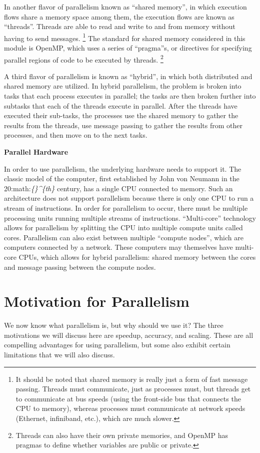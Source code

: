\documentclass[letterpaper,10pt,openany,oneside]{sphinxmanual}
\begin{document}
In another flavor of parallelism known as “shared memory”, in which
execution flows share a memory space among them, the execution flows are
known as “threads”. Threads are able to read and write to and from
memory without having to send messages. \footnote{
It should be noted that shared memory is really just a form of fast message passing. Threads must communicate, just as processes must, but threads get to communicate at bus speeds (using the front-side bus that connects the CPU to memory), whereas processes must communicate at network speeds (Ethernet, infiniband, etc.), which are much slower.
} The standard for shared
memory considered in this module is OpenMP, which uses a series of
“pragma”s, or directives for specifying parallel regions of code to be
executed by threads. \footnote{
Threads can also have their own private memories, and OpenMP has pragmas to define whether variables are public or private.
}

A third flavor of parallelism is known as “hybrid”, in which both
distributed and shared memory are utilized. In hybrid parallelism, the
problem is broken into tasks that each process executes in parallel; the
tasks are then broken further into subtasks that each of the threads
execute in parallel. After the threads have executed their sub-tasks,
the processes use the shared memory to gather the results from the
threads, use message passing to gather the results from other processes,
and then move on to the next tasks.

\textbf{Parallel Hardware}

In order to use parallelism, the underlying hardware needs to support
it. The classic model of the computer, first established by John von
Neumann in the 20:math:\emph{\{\}\textasciicircum{}\{th\}} century, has a single CPU connected to
memory. Such an architecture does not support parallelism because there
is only one CPU to run a stream of instructions. In order for
parallelism to occur, there must be multiple processing units running
multiple streams of instructions. “Multi-core” technology allows for
parallelism by splitting the CPU into multiple compute units called
cores. Parallelism can also exist between multiple “compute nodes”,
which are computers connected by a network. These computers may
themselves have multi-core CPUs, which allows for hybrid parallelism:
shared memory between the cores and message passing between the compute
nodes.


\section{Motivation for Parallelism}
\label{0-Introduction/introduction:motivation-for-parallelism}
We now know what parallelism is, but why should we use it? The three
motivations we will discuss here are speedup, accuracy, and scaling.
These are all compelling advantages for using parallelism, but some also
exhibit certain limitations that we will also discuss.
\end{document}
